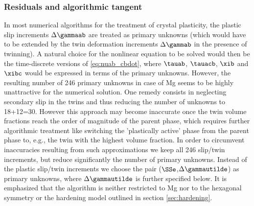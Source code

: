 \subsubsection{Residuals and algorithmic tangent}
  In most numerical algorithms for the treatment of crystal plasticity, the plastic slip increments $\Delta\gammaab$ are treated as primary unknowns (which would have to be extended by the twin deformation increments $\Delta\gammab$ in the presence of twinning). A natural choice for the nonlinear equation to be solved would then be the time-discrete versions of \cref{eq:nuab_cbdot}, where $\tauab$, $\tauacb$, $\xib$ and $\xibc$ would be expressed in terms of the primary unknowns. However, the resulting number of 246 primary unknowns in case of Mg seems to be highly unattractive for the numerical solution. One remedy consists in neglecting secondary slip in the twins and thus reducing the number of unknowns to 18+12=30. However this approach may become inaccurate once the twin volume fractions reach the order of magnitude of the parent phase, which requires further algorithmic treatment like switching the 'plastically active' phase from the parent phase to, e.g., the twin with the highest volume fraction. In order to circumvent inaccuracies resulting from such approximations we keep all 246 slip/twin increments, but reduce significantly the number of primary unknowns. Instead of the plastic slip/twin increments we choose the pair ($\SSe$,$\Delta\gammautilde$) as primary unknowns, where $\Delta\gammautilde$ is further specified below. It is emphasized that the algorithm is neither restricted to Mg nor to the hexagonal symmetry or the hardening model outlined in section \ref{sec:hardening}.

